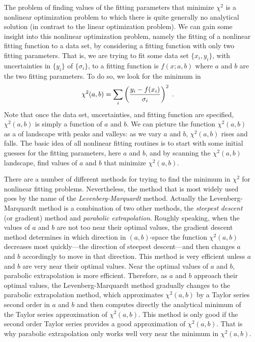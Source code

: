 \documentclass[letterpaper,10pt,english]{sphinxmanual}
\begin{document}
The problem of finding values of the fitting parameters that minimize $\chi^2$ is a nonlinear optimization problem to which there is quite generally no analytical solution (in contrast to the linear optimization problem).  We can gain some insight into this nonlinear optimization problem, namely the fitting of a nonlinear fitting function to a data set, by considering a fitting function with only two fitting parameters.  That is, we are trying to fit some data set $\{x_{i},y_{i}\}$, with uncertainties in $\{y_{i}\}$ of $\{\sigma_{i}\}$, to a fitting function is $f(x;a,b)$ where $a$ and $b$ are the two fitting parameters.  To do so, we look for the minimum in
\begin{gather}
\begin{split}\chi^2(a,b) = \sum_{i} \left(\frac{y_{i} - f(x_{i})}{\sigma_{i}}\right)^2 \;.\end{split}\notag
\end{gather}
Note that once the data set, uncertainties, and fitting function are specified,  $\chi^2(a,b)$ is simply a function of $a$ and $b$.  We can picture the function $\chi^2(a,b)$ as a of landscape with peaks and valleys: as we vary $a$ and $b$, $\chi^2(a,b)$ rises and falls.  The basic idea of all nonlinear fitting routines is to start with some initial guesses for the fitting parameters, here $a$ and $b$, and by scanning the $\chi^2(a,b)$ landscape, find values of $a$ and $b$ that minimize $\chi^2(a,b)$.

There are a number of different methods for trying to find the minimum in $\chi^2$ for nonlinear fitting problems.  Nevertheless, the method that is most widely used goes by the name of the \emph{Levenberg-Marquardt} method.  Actually the Levenberg-Marquardt method is a combination of two other methods, the \emph{steepest descent} (or gradient) method and \emph{parabolic extrapolation}.  Roughly speaking, when the values of $a$ and $b$ are not too near their optimal values, the gradient descent method determines in which direction in $(a,b)$-space the function $\chi^2(a,b)$ decreases most quickly---the direction of steepest descent---and then changes $a$ and $b$ accordingly to move in that direction.  This method is very efficient unless $a$ and $b$ are very near their optimal values.  Near the optimal values of $a$ and $b$, parabolic extrapolation is more efficient.  Therefore, as  $a$ and $b$ approach their optimal values, the Levenberg-Marquardt method gradually changes to the parabolic extrapolation method, which approximates $\chi^2(a,b)$ by a Taylor series second order in $a$ and $b$ and then computes directly the analytical minimum of the Taylor series approximation of $\chi^2(a,b)$.  This method is only good if the second order Taylor series provides a good approximation of $\chi^2(a,b)$.  That is why parabolic extrapolation only works well very near the minimum in $\chi^2(a,b)$.
\end{document}
